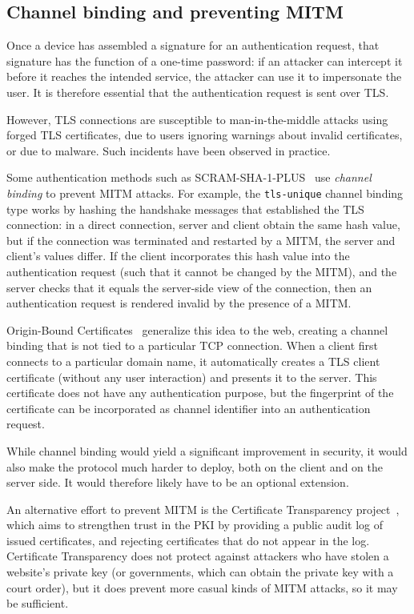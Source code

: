 \subsection{Channel binding and preventing MITM}\label{sec:channelbinding}

Once a device has assembled a signature for an authentication request, that signature has the
function of a one-time password: if an attacker can intercept it before it reaches the intended
service, the attacker can use it to impersonate the user. It is therefore essential that the
authentication request is sent over TLS.

However, TLS connections are susceptible to man-in-the-middle attacks using forged TLS certificates,
due to users ignoring warnings about invalid certificates, or due to malware. Such incidents have
been observed in practice.~\cite{Huang14, Adkins11}

Some authentication methods such as SCRAM-SHA-1-PLUS~\cite{SCRAM} use \emph{channel binding} to
prevent MITM attacks. For example, the \texttt{tls-unique} channel binding type works by hashing the
handshake messages that established the TLS connection: in a direct connection, server and client
obtain the same hash value, but if the connection was terminated and restarted by a MITM, the server
and client's values differ. If the client incorporates this hash value into the authentication
request (such that it cannot be changed by the MITM), and the server checks that it equals the
server-side view of the connection, then an authentication request is rendered invalid by the
presence of a MITM.

Origin-Bound Certificates~\cite{Dietz12} generalize this idea to the web, creating a channel
binding that is not tied to a particular TCP connection. When a client first connects to a
particular domain name, it automatically creates a TLS client certificate (without any user
interaction) and presents it to the server. This certificate does not have any authentication
purpose, but the fingerprint of the certificate can be incorporated as channel identifier into an
authentication request.

While channel binding would yield a significant improvement in security, it would also make the
protocol much harder to deploy, both on the client and on the server side. It would therefore likely
have to be an optional extension.

An alternative effort to prevent MITM is the Certificate Transparency project~\cite{CertTrans},
which aims to strengthen trust in the PKI by providing a public audit log of issued certificates,
and rejecting certificates that do not appear in the log. Certificate Transparency does not protect
against attackers who have stolen a website's private key (or governments, which can obtain the
private key with a court order), but it does prevent more casual kinds of MITM attacks, so it may be
sufficient.
